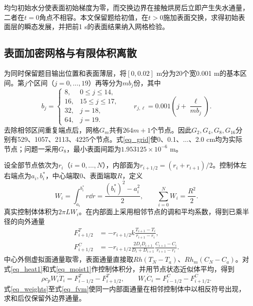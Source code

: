 均匀初始水分使表面初始梯度为零，而交换边界在接触烘房后立即产生失水通量，二者在$t=0$角点不相容。本文保留题给初值，在$t>0$施加表面交换，求得初始表面层的瞬态发展，并把前1 s的表面结果纳入网格检验。

\subsection{表面加密网格与有限体积离散}
为同时保留题目输出位置和表面薄层，将$[0,0.02]$ m分为20个宽0.001 m的基本区间。第$j$个区间（$j=0,\ldots,19$）再等分为$mb_j$份，其中
\begin{equation}\label{eq_grid}
b_j=\begin{cases}
8,&0\le j\le14,\\16,&15\le j\le17,\\32,&j=18,\\64,&j=19.
\end{cases}
\qquad r_{j,\ell}=0.001\left(j+\frac{\ell}{mb_j}\right).
\end{equation}
去除相邻区间重复端点后，网格$G_m$共有$264m+1$个节点。因此$G_2,G_4,G_8,G_{16}$分别有529、1057、2113、4225个节点。式\eqref{eq_grid}使0、0.1、$\ldots$、2.0 cm均为实际节点；问题一采用$G_8$，最小表面间距为$1.953125\times10^{-6}$ m。

设全部节点依次为$r_i$（$i=0,\ldots,N$），内部面为$r_{i+1/2}=(r_i+r_{i+1})/2$。控制体左右端点为$a_i,b_i^*$，中心端取0、表面端取$R$，定义
\begin{equation}\label{eq_weights}
W_i=\int_{a_i}^{b_i^*}r\dd r=\frac{(b_i^*)^2-a_i^2}{2},
\qquad \sum_{i=0}^NW_i=\frac{R^2}{2}.
\end{equation}
真实控制体体积为$2\pi LW_i$。在内部面上采用相邻节点的调和平均系数，得到已乘半径的向外通量
\begin{equation}\label{eq_flux}
\begin{aligned}
F^T_{i+1/2}&=-r_{i+1/2}k\frac{T_{i+1}-T_i}{r_{i+1}-r_i},\\
F^C_{i+1/2}&=-r_{i+1/2}\frac{2D_iD_{i+1}}{D_i+D_{i+1}}
\frac{C_{i+1}-C_i}{r_{i+1}-r_i}.
\end{aligned}
\end{equation}
中心外侧虚拟面通量取零，表面通量直接取$Rh(T_N-T_a)$、$Rh_m(C_N-C_a)$。对式\eqref{eq_heat1}和式\eqref{eq_moist1}作控制体积分，并用节点状态近似体平均，得到
\begin{equation}\label{eq_fvm}
\rho c_pW_i\dot T_i=F^T_{i-1/2}-F^T_{i+1/2},\qquad
W_i\dot C_i=F^C_{i-1/2}-F^C_{i+1/2}.
\end{equation}
式\eqref{eq_weights}至式\eqref{eq_fvm}使同一内部面通量在相邻控制体中以相反符号出现，求和后仅保留外边界通量。

